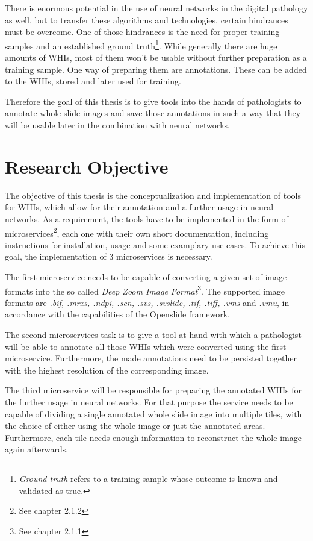 There is enormous potential in the use of neural networks in the digital pathology as well, but to transfer these algorithms and technologies, certain hindrances must be overcome. One of those hindrances is the need for proper training samples and an established ground truth\footnote{\emph{Ground truth} refers to a training sample whose outcome is known and validated as true.}. While generally there are huge amounts of WHIs, most of them won't be usable without further preparation as a training sample. One way of preparing them are annotations. These can be added to the WHIs, stored and later used for training.

Therefore the goal of this thesis is to give tools into the hands of pathologists to annotate whole slide images and save those annotations in such a way that they will be usable later in the combination with neural networks.


\section{Research Objective}
The objective of this thesis is the conceptualization and implementation of tools for WHIs, which allow for their annotation and a further usage in neural networks. As a requirement, the tools have to be implemented in the form of microservices\footnote{See chapter 2.1.2}, each one with their own short documentation, including instructions for installation, usage and some examplary use cases. To achieve this goal, the implementation of 3 microservices is necessary.

The first microservice needs to be capable of converting a given set of image formats into the so called \emph{Deep Zoom Image Format}\footnote{See chapter 2.1.1}. The supported image formats are \emph{.bif, .mrxs, .ndpi, .scn, .svs, .svslide, .tif, .tiff, .vms} and \emph{.vmu}, in accordance with the capabilities of the Openslide framework\cite{Goode13}.

The second microservices task is to give a tool at hand with which a pathologist will be able to annotate all those WHIs which were converted using the first microservice. Furthermore, the made annotations need to be persisted together with the highest resolution of the corresponding image.

The third microservice will be responsible for preparing the annotated WHIs for the further usage in neural networks. For that purpose the service needs to be capable of dividing a single annotated whole slide image into multiple tiles, with the choice of either using the whole image or just the annotated areas. Furthermore, each tile needs enough information to reconstruct the whole image again afterwards.


